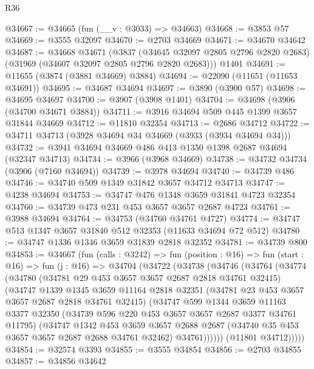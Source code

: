 \begin{lexlean}{R36}
\begin{coremodule}
@34667 := @34665 (fun (__v : @3033) => @34663)
@34668 := @3853 @57
@34669 := @3555 @32097
@34670 := @2703 @34669
@34671 := @34670 @34642
@34687 := @34668
    @34671
    (@3837 (@34645 @32097 @2805 @2796 @2820 @2683) (@31969 (@34607 @32097 @2805 @2796 @2820 @2683)))
    @1401
@34691 := @11655 (@3874 (@3881 @34669) @3884)
@34694 := @22090 (@11651 (@11653 @34691))
@34695 := @34687 @34694
@34697 := @3890 (@3900 @57)
@34698 := @34695 @34697
@34700 := @3907 (@3908 @1401)
@34704 := @34698 (@3906 (@34700 @34671 @3884))
@34711 := @3916 @34694 @509 @445 @1399 @3657 @31844 @34669
@34712 := @11810 @32354
@34713 := @2686 @34712
@34722 := @34711 @34713 (@3928 @34694 @34 @34669 (@3933 (@3934 @34694 @34)))
@34732 := @3941 @34694 @34669 @486 @413 @1350 @1398 @2687 @34694 (@32347 @34713)
@34734 := @3966 (@3968 @34669)
@34738 := @34732 @34734 (@3906 (@7160 @34694))
@34739 := @3978 @34694
@34740 := @34739 @486
@34746 := @34740 @509 @1349 @31842 @3657 @34712 @34713
@34747 := @4238 @34694
@34753 := @34747 @476 @1348 @3659 @31841 @4723 @32354
@34760 := @34739 @473 @231 @453 @3657 @3657 @2687 @4723
@34761 := @3988 @34694
@34764 := @34753 (@34760 @34761 @4727)
@34774 := @34747 @513 @1347 @3657 @31840 @512 @32353 (@11633 @34694 @72 @512)
@34780 := @34747 @1336 @1346 @3659 @31839 @2818 @32352
@34781 := @34739 @800
@34853 := @34667
    (fun (calls : @3242) =>
    fun (position : @16) =>
    fun (start : @16) =>
    fun (j : @16) =>
    @34704
      (@34722
        (@34738
          (@34746
            (@34764
              (@34774
                (@34780
                  (@34781 @29 @453 @3657 @3657 @2687 @2818 @34761 @32415)
                  (@34747
                    @1339
                    @1345
                    @3659
                    @11164
                    @2818
                    @32351
                    (@34781 @23 @453 @3657 @3657 @2687 @2818 @34761 @32415)
                    (@34747
                      @599
                      @1344
                      @3659
                      @11163
                      @3377
                      @32350
                      (@34739 @596 @220 @453 @3657 @3657 @2687 @3377 @34761 @11795)
                      (@34747
                        @1342
                        @453
                        @3659
                        @3657
                        @2688
                        @2687
                        (@34740 @35 @453 @3657 @3657 @2687 @2688 @34761 @32462)
                        @34761))))))
            (@11801 @34712)))))
@34854 := @32574 @3393
@34855 := @3555 @34854
@34856 := @2703 @34855
@34857 := @34856 @34642

\end{coremodule}
\end{lexlean}
